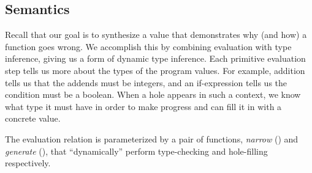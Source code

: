 

\subsection{Semantics}
\label{sec:semantics}
%
Recall that our goal is to synthesize a value that demonstrates
why (and how) a function goes wrong.
%
We accomplish this by combining evaluation with type inference,
giving us a form of dynamic type inference.
%
Each primitive evaluation step tells us more about the types of the
program values. For example, addition tells us that the addends must be
integers, and %
an if-expression tells us the condition must be a boolean.
%
When a hole appears in such a context, we know what type it must have
in order to make progress and can fill it in with a concrete value.

The evaluation relation is parameterized by a pair of functions,
\emph{narrow} (\forcesym) and \emph{generate} (\gensym),
that ``dynamically'' perform type-checking and hole-filling
respectively.

